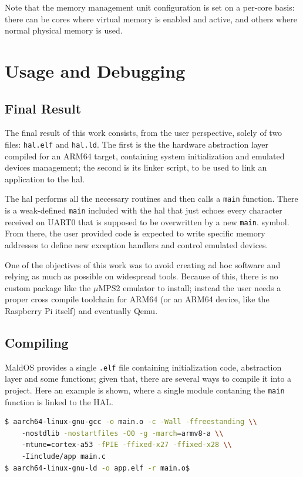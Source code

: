 \documentclass[12pt,a4paper,openright,twoside]{report}
\begin{document}
Note that the memory management unit configuration is set on a per-core basis:
there can be cores where virtual memory is enabled and active, and others where
normal physical memory is used.


\clearpage{\pagestyle{empty}\cleardoublepage}
\chapter{Usage and Debugging}
\section{Final Result}
The final result of this work consists, from the user perspective, solely of 
two files: {\tt hal.elf} and {\tt hal.ld}.
The first is the the hardware abstraction layer compiled for an ARM64 target, 
containing system initialization and emulated devices management; the second is 
its linker script, to be used to link an application to the hal.

The hal performs all the necessary routines and then calls a {\tt main} function.
There is a weak-defined {\tt main} included with the hal that just echoes every
character received on UART0 that is supposed to be overwritten by a new {\tt main}.
symbol.
From there, the user provided code is expected to write specific memory addresses
to define new exception handlers and control emulated devices. 

One of the objectives of this work was to avoid creating ad hoc software and
relying as much as possible on widespread tools. Because of this, there is no
custom package like the $\mu$MPS2 emulator to install; instead the user needs
a proper cross compile toolchain for ARM64 (or an ARM64 device, like the Raspberry
Pi itself) and eventually Qemu.

\section{Compiling}
\label{compiling}
MaldOS provides a single {\tt .elf} file containing initialization code, abstraction
layer and some functions; given that, there are several ways to compile it 
into a project. Here an example is shown, where a single module contaning the {\tt main}
function is linked to the HAL.

\begin{lstlisting}[language=bash]
$ aarch64-linux-gnu-gcc -o main.o -c -Wall -ffreestanding \\
    -nostdlib -nostartfiles -O0 -g -march=armv8-a \\
    -mtune=cortex-a53 -fPIE -ffixed-x27 -ffixed-x28 \\
    -Iinclude/app main.c
$ aarch64-linux-gnu-ld -o app.elf -r main.o$
\end{lstlisting}
\end{document}
